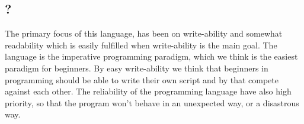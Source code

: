 \subsection{?}
The primary focus of this language, has been on write-ability and somewhat readability which is easily fulfilled when write-ability is the main goal. The language is the imperative programming paradigm, which we think is the easiest paradigm for beginners. By easy write-ability we think that beginners in programming should be able to write their own script and by that compete against each other. The reliability of the programming language have also high priority, so that the program won't behave in an unexpected way, or a disastrous way.
